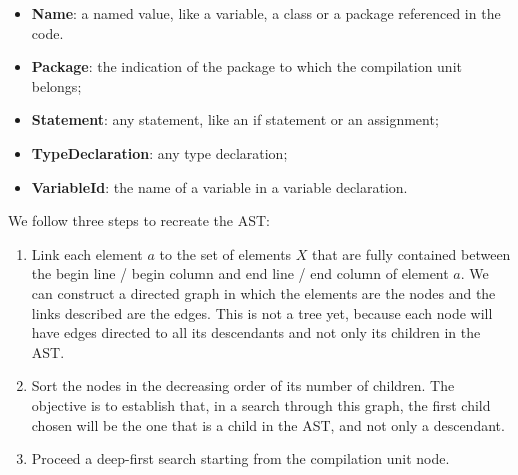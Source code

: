 \documentclass[
]{article}
\begin{document}
\begin{itemize}
\item \textbf{Name}: a named value, like a variable, a class or a package referenced in the code.

\item \textbf{Package}: the indication of the package to which the compilation unit belongs;

\item \textbf{Statement}: any statement, like an if statement or an assignment;

\item \textbf{TypeDeclaration}: any type declaration;

\item \textbf{VariableId}: the name of a variable in a variable declaration.
\end{itemize}

We follow three steps to recreate the AST:

\begin{enumerate}
\def\labelenumi{\arabic{enumi}.}
\item
  Link each element \(a\) to the set of elements \(X\) that are fully
  contained between the begin line / begin column and end line / end
  column of element \(a\). We can construct a directed graph in which
  the elements are the nodes and the links described are the edges. This
  is not a tree yet, because each node will have edges directed to all
  its descendants and not only its children in the AST.

\item
  Sort the nodes in the decreasing order of its number of children. The
  objective is to establish that, in a search through this graph, the
  first child chosen will be the one that is a child in the AST, and not
  only a descendant.

\item
  Proceed a deep-first search starting from the compilation unit node.
\end{enumerate}


\end{document}
